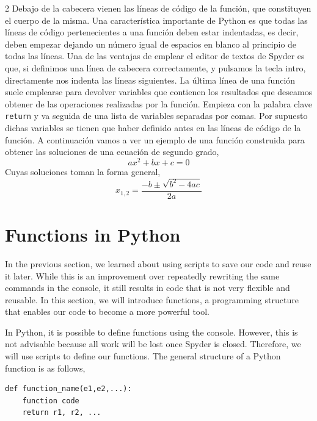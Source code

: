 \begin{paracol}{2}
Debajo de la cabecera vienen las líneas de código de la función, que constituyen el cuerpo de la misma. Una característica importante de Python es que todas las líneas de código pertenecientes a una función deben estar indentadas, es decir, deben empezar dejando un número igual de espacios en blanco al principio de todas las líneas. Una de las ventajas de emplear el editor de textos de Spyder es que, si definimos una línea de cabecera correctamente,  y pulsamos la tecla intro, directamente nos indenta las líneas siguientes. La última línea de una función suele emplearse para devolver variables que contienen los resultados que deseamos obtener de las operaciones realizadas por la función. Empieza con la palabra clave \texttt{return} y va seguida de una lista de variables separadas por comas. Por supuesto dichas variables se tienen que haber definido antes en las líneas de código de la función. A continuación vamos a ver un ejemplo de una función construida para obtener las soluciones de una ecuación de segundo grado,
\begin{equation*}
    ax^2+bx+c = 0
\end{equation*}
Cuyas soluciones toman la forma general,
\begin{equation*}
    x_{1,2} = \frac{-b\pm \sqrt{b^2-4ac}}{2a}
\end{equation*}
\switchcolumn
\section[Functions in Python]{Functions in Python} 
In the previous section, we learned about using scripts to save our code and reuse it later. While this is an improvement over repeatedly rewriting the same commands in the console, it still results in code that is not very flexible and reusable. In this section, we will introduce functions, a programming structure that enables our code to become a more powerful tool.

In Python, it is possible to define functions using the console. However, this is not advisable because all work will be lost once Spyder is closed. Therefore, we will use scripts to define our functions. The general structure of a Python function is as follows,

\begin{verbatim}
def function_name(e1,e2,...):
    function code
    return r1, r2, ...
\end{verbatim}


\end{paracol}

